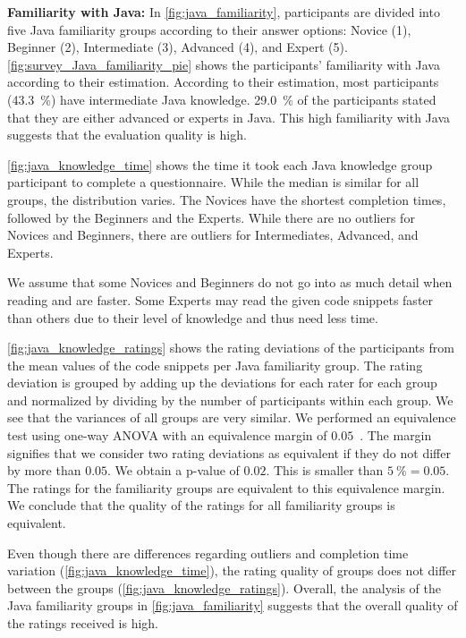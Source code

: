 \documentclass[%
class=scrreprt,
chapterprefix=false,%
open=right,%
twoside=true,%
paper=a4,%
logofile={Logo\_zentral\_farbig\_EN.png},%
thesistype=master,%
UKenglish,%
]{se2thesis}
\theoremstyle{definition}
\begin{document}
	\textbf{Familiarity with Java:}
    In \autoref{fig:java_familiarity}, participants are divided into five Java familiarity groups according to their answer options: Novice (1), Beginner (2), Intermediate (3), Advanced (4), and Expert (5).
    \autoref{fig:survey_Java_familiarity_pie} shows the participants' familiarity with Java according to their estimation.
    According to their estimation, most participants (43.3~\%) have intermediate Java knowledge.
    29.0~\% of the participants stated that they are either advanced or experts in Java. This high familiarity with Java suggests that the evaluation quality is high.
	
	\autoref{fig:java_knowledge_time} shows the time it took each Java knowledge group participant to complete a questionnaire. While the median is similar for all groups, the distribution varies. The Novices have the shortest completion times, followed by the Beginners and the Experts. While there are no outliers for Novices and Beginners, there are outliers for Intermediates, Advanced, and Experts. 
	
	We assume that some Novices and Beginners do not go into as much detail when reading and are faster. Some Experts may read the given code snippets faster than others due to their level of knowledge and thus need less time.
	
	\autoref{fig:java_knowledge_ratings} shows the rating deviations of the participants from the mean values of the code snippets per Java familiarity group. The rating deviation is grouped by adding up the deviations for each rater for each group and normalized by dividing by the number of participants within each group. We see that the variances of all groups are very similar.
	We performed an equivalence test using one-way ANOVA with an equivalence margin of $0.05$~\cite{tabachnick2013using}.
	The margin signifies that we consider two rating deviations as equivalent if they do not differ by more than $0.05$.
	We obtain a p-value of $0.02$. This is smaller than $5~\%=0.05$. The ratings for the familiarity groups are equivalent to this equivalence margin.
	We conclude that the quality of the ratings for all familiarity groups is equivalent.

	Even though there are differences regarding outliers and completion time variation (\autoref{fig:java_knowledge_time}), the rating quality of groups does not differ between the groups (\autoref{fig:java_knowledge_ratings}). Overall, the analysis of the Java familiarity groups in \autoref{fig:java_familiarity} suggests that the overall quality of the ratings received is high. 
	
\end{document}
